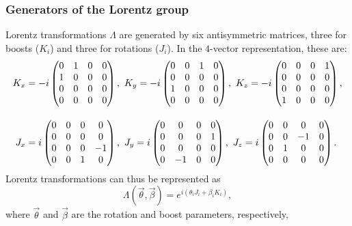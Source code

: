 \subsubsection{Generators of the Lorentz group}

Lorentz transformations $\Lambda$ are generated by six antisymmetric matrices, three for boosts ($K_i$) and three for rotations ($J_i$).
In the $4$-vector representation, these are:
\begin{equation} 
	\begin{split}
	\label{eq:01_lorentz_generators}
	K_x &= -i\begin{pmatrix}
		\setlength{\arraycolsep}{10pt}
		0 & 1 & 0 & 0 \\
		1 & 0 & 0 & 0 \\
		0 & 0 & 0 & 0 \\
		0 & 0 & 0 & 0
	\end{pmatrix}, \ 
	K_y = -i\begin{pmatrix}
		0 & 0 & 1 & 0 \\
		0 & 0 & 0 & 0 \\
		1 & 0 & 0 & 0 \\
		0 & 0 & 0 & 0
	\end{pmatrix}, \ 
	K_z = -i\begin{pmatrix}
		0 & 0 & 0 & 1 \\
		0 & 0 & 0 & 0 \\
		0 & 0 & 0 & 0 \\
		1 & 0 & 0 & 0
	\end{pmatrix}, \\[1em]
	\setlength{\arraycolsep}{5pt}
	J_x &= i\begin{pmatrix}
		0 & 0 & 0 & 0 \\
		0 & 0 & 0 & 0 \\
		0 & 0 & 0 & -1 \\
		0 & 0 & 1 & 0
	\end{pmatrix}, \ 
	J_y = i\begin{pmatrix}
		0 & 0 & 0 & 0 \\
		0 & 0 & 0 & 1 \\
		0 & 0 & 0 & 0 \\
		0 & -1 & 0 & 0
	\end{pmatrix}, \ 
	J_z = i\begin{pmatrix}
		0 & 0 & 0 & 0 \\
		0 & 0 & -1 & 0 \\
		0 & 1 & 0 & 0 \\
		0 & 0 & 0 & 0
	\end{pmatrix}.
\end{split} 
\end{equation}
Lorentz transformations can thus be represented as
\begin{equation}
	\label{eq:01_lorentz_generators_exponential}
\Lambda(\vec{\theta}, \vec{\beta}) = e^{i(\theta_i J_i + \beta_i K_i)},
\end{equation}
where $\vec{\theta}$ and $\vec{\beta}$ are the rotation and boost parameters, respectively,

